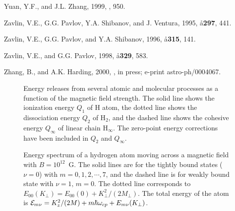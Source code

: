 \begin{references}
\harvarditem{}{}{}
Yuan, Y.F., and J.L. Zhang, 1999, , 950.


\harvarditem{}{}{}
Zavlin, V.E., G.G. Pavlov, Y.A. Shibanov, and J. Ventura,
1995, \aa {\bf 297}, 441.

\harvarditem{}{}{}
Zavlin, V.E., G.G. Pavlov, and Y.A. Shibanov, 1996, \aa {\bf 315}, 141.

Zavlin, V.E., and G.G. Pavlov, 1998, \aa {\bf 329}, 583.

\harvarditem{}{}{}
Zhang, B., and A.K. Harding, 2000, \apj, in press; e-print astro-ph/0004067.

\end{references}

\newpage

\begin{figure}[t]
\vspace*{60mm}
\caption{Energy releases from several atomic and molecular processes as a
function of the magnetic field strength. The solid line shows the ionization
energy $Q_1$ of H atom, the dotted line shows the dissociation energy $Q_2$ of
H$_2$, and the dashed line shows the cohesive energy $Q_\infty$ of linear 
chain H$_\infty$. The zero-point energy corrections have been included in
$Q_2$ and $Q_\infty$.}
\end{figure}

\begin{figure}[t]
\vspace*{60mm}
\caption{Energy spectrum of a hydrogen atom moving across a magnetic
field with $B=10^{12}$~G. The solid lines are for the tightly bound
states ($\nu=0$) with $m=0,1,2,\cdots,7$, and the dashed line is
for weakly bound state with $\nu=1,\,m=0$. The dotted line corresponds
to $E_{00}(K_\perp)=E_{00}(0)+K_\perp^2/(2M_\perp)$. The total energy of
the atom is ${\cal E}_{m\nu}=K_z^2/(2M)+m\hbar\omega_{cp}+E_{m\nu}(K_\perp)$.}
\end{figure}

\clearpage

